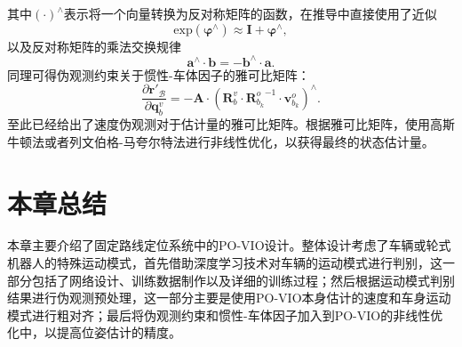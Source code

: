 其中$(\cdot)^{\land}$表示将一个向量转换为反对称矩阵的函数，在推导中直接使用了近似
\begin{equation}
  \text{exp}(\symbf{\varphi }^{\land}) \approx \symbf{I} + \symbf{\varphi }^{\land},
\end{equation}
以及反对称矩阵的乘法交换规律
\begin{equation}
  \symbf{a}^{\land} \cdot \symbf{b} = -\symbf{b}^{\land} \cdot \symbf{a}.
\end{equation}
同理可得伪观测约束关于惯性-车体因子的雅可比矩阵：
\begin{equation}
  \frac{\partial \symbf{r}'_{\mathcal{B}}}{\partial \symbf{q}_{b}^v} = -\symbf{A} \cdot (\symbf{R}_b^v \cdot {\symbf{R}_{b_k}^o}^{-1} \cdot \symbf{v}_{b_k}^o)^{\land}.
  \label{eq:JrJqv}
\end{equation}
至此已经给出了速度伪观测对于估计量的雅可比矩阵。根据雅可比矩阵，使用高斯牛顿法或者列文伯格-马夸尔特法进行非线性优化，以获得最终的状态估计量。

\section{本章总结}
本章主要介绍了固定路线定位系统中的PO-VIO设计。整体设计考虑了车辆或轮式机器人的特殊运动模式，首先借助深度学习技术对车辆的运动模式进行判别，这一部分包括了网络设计、训练数据制作以及详细的训练过程；然后根据运动模式判别结果进行伪观测预处理，这一部分主要是使用PO-VIO本身估计的速度和车身运动模式进行粗对齐；最后将伪观测约束和惯性-车体因子加入到PO-VIO的非线性优化中，以提高位姿估计的精度。